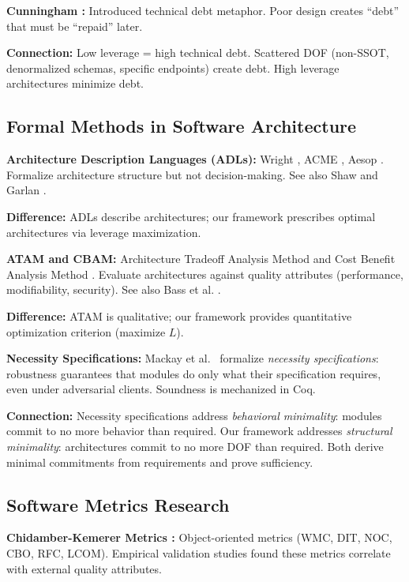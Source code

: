 \textbf{Cunningham \cite{cunningham1992wycash}:} Introduced technical debt metaphor. Poor design creates ``debt'' that must be ``repaid'' later.

\textbf{Connection:} Low leverage = high technical debt. Scattered DOF (non-SSOT, denormalized schemas, specific endpoints) create debt. High leverage architectures minimize debt.

\subsection{Formal Methods in Software Architecture}

\textbf{Architecture Description Languages (ADLs):} Wright \cite{allen1997formal}, ACME \cite{garlan1997acme}, Aesop \cite{garlan1994exploiting}. Formalize architecture structure but not decision-making. See also Shaw and Garlan \cite{shaw1996software}.

\textbf{Difference:} ADLs describe architectures; our framework prescribes optimal architectures via leverage maximization.

\textbf{ATAM and CBAM:} Architecture Tradeoff Analysis Method \cite{kazman2000atam} and Cost Benefit Analysis Method \cite{bachmann2000cbam}. Evaluate architectures against quality attributes (performance, modifiability, security). See also Bass et al. \cite{bass2012software}.

\textbf{Difference:} ATAM is qualitative; our framework provides quantitative optimization criterion (maximize $L$).

\textbf{Necessity Specifications:} Mackay et al.~\cite{mackay2022necessity} formalize \emph{necessity specifications}: robustness guarantees that modules do only what their specification requires, even under adversarial clients. Soundness is mechanized in Coq.

\textbf{Connection:} Necessity specifications address \emph{behavioral minimality}: modules commit to no more behavior than required. Our framework addresses \emph{structural minimality}: architectures commit to no more DOF than required. Both derive minimal commitments from requirements and prove sufficiency.

\subsection{Software Metrics Research}

\textbf{Chidamber-Kemerer Metrics \cite{chidamber1994metrics}:} Object-oriented metrics (WMC, DIT, NOC, CBO, RFC, LCOM). Empirical validation studies \cite{basili1996comparing} found these metrics correlate with external quality attributes.

